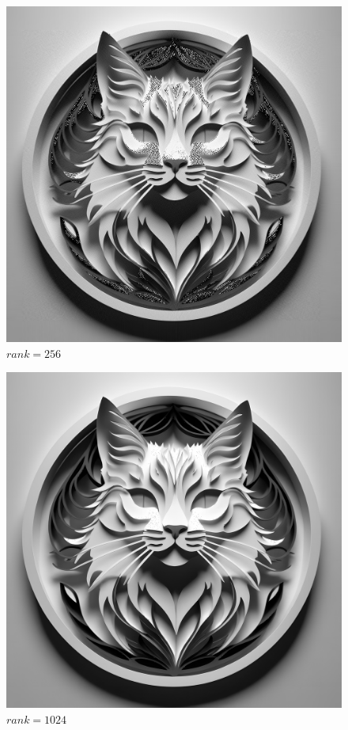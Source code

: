 \begin{figure}
  \includegraphics[width=\linewidth]{../image-compression/cat-256.png}
  \caption{$rank=256$}
  \label{fig:cat-bw-rank-256}
\end{figure}


\begin{figure}
  \includegraphics[width=\linewidth]{../image-compression/cat-1024.png}
  \caption{$rank=1024$}
  \label{fig:cat-bw-rank-1024}
\end{figure}

